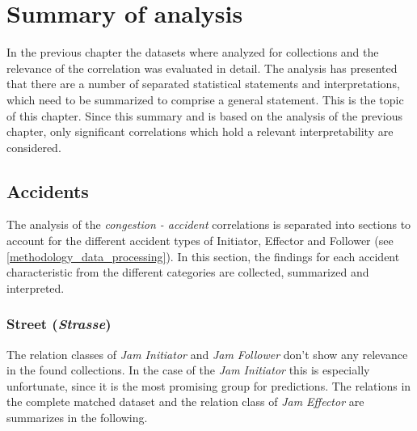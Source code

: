 \chapter{Summary of analysis}
\label{analysis_summary}
In the previous chapter the datasets where analyzed for collections and the relevance of the correlation was evaluated in detail. The analysis has presented that there are a number of separated statistical statements and interpretations, which need to be summarized to comprise a general statement. This is the topic of this chapter. Since this summary and is based on the analysis of the previous chapter, only significant correlations which hold a relevant interpretability are considered.

\section{Accidents}
\label{analysis_summary_accident}
The analysis of the \textit{congestion - accident} correlations is separated into sections to account for the different accident types of Initiator, Effector and Follower (see \cref{methodology_data_processing}). In this section, the findings for each accident characteristic from the different categories are collected, summarized and interpreted. 

\subsection{Street (\textit{Strasse})}
\label{analysis_sum_Strasse}
The relation classes of \textit{Jam Initiator} and \textit{Jam Follower} don't show any relevance in the found collections. In the case of the \textit{Jam Initiator} this is especially unfortunate, since it is the most promising group for predictions. The relations in the complete matched dataset and the relation class of \textit{Jam Effector} are summarizes in the following.


